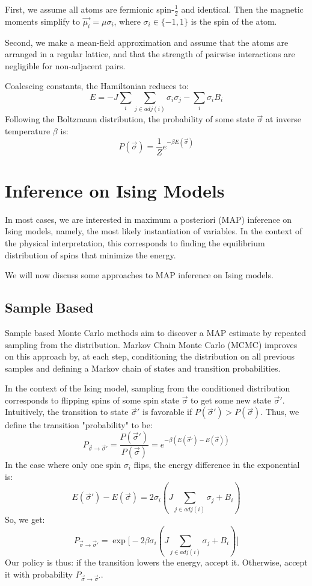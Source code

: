 \documentclass{article}
\begin{document}
First, we assume all atoms are fermionic spin-$\frac{1}{2}$ and identical. 
Then the magnetic moments simplify to $\vec{\mu_i} = \mu \sigma_i$, where 
$\sigma_i \in \{-1, 1\}$ is the spin of the atom. 

Second, we make a mean-field approximation and assume that the atoms are 
arranged in a regular lattice, and that the strength of pairwise interactions 
are negligible for non-adjacent pairs.

Coalescing constants, the Hamiltonian reduces to:
\begin{equation}\label{isingE}
    E = -J\sum_i \sum_{j \in adj(i)} \sigma_i \sigma_j - \sum_i \sigma_i B_i
\end{equation}
Following the Boltzmann distribution, the probability of some state 
$\vec{\sigma}$ at inverse temperature $\beta$ is:
\begin{equation} \label{boltzmann}
    P(\vec{\sigma}) = \frac{1}{Z}e^{-\beta E(\vec{\sigma})} 
\end{equation}

\section{Inference on Ising Models}

In most cases, we are interested in maximum a posteriori (MAP) inference on 
Ising models, namely, the most likely instantiation of variables. 
In the context of the physical interpretation, this corresponds to finding the 
equilibrium distribution of spins that minimize the energy. 

We will now discuss some approaches to MAP inference on Ising models. 

\subsection{Sample Based}

Sample based Monte Carlo methods aim to discover a MAP estimate by repeated 
sampling from the distribution. 
Markov Chain Monte Carlo (MCMC) improves on this approach by, at each step, 
conditioning the distribution on all previous samples and defining a Markov 
chain of states and transition probabilities. 

In the context of the Ising model, sampling from the conditioned distribution 
corresponds to flipping spins of some spin state $\vec{\sigma}$ to get some 
new state $\vec{\sigma}'$. 
Intuitively, the transition to state $\vec{\sigma}'$ is favorable if 
$P(\vec{\sigma}') > P(\vec{\sigma})$. 
Thus, we define the transition "probability" to be:
\[
    P_{\vec{\sigma} \rightarrow \vec{\sigma}'}
    = \frac{P(\vec{\sigma}')}{P(\vec{\sigma})}
    = e^{-\beta(E(\vec{\sigma}') - E(\vec{\sigma}))} 
\]
In the case where only one spin $\sigma_i$ flips, the energy difference in the 
exponential is:
\[
    E(\vec{\sigma}') - E(\vec{\sigma}) = 2 \sigma_i (J \sum_{j \in adj(i)} \sigma_j + B_i)
\]
So, we get:
\[
    P_{\vec{\sigma} \rightarrow \vec{\sigma}'}
    = \exp \Bigr [-2 \beta \sigma_i (J \sum_{j \in adj(i)} \sigma_j + B_i) \Bigr ]
\]
Our policy is thus: if the transition lowers the energy, accept it. 
Otherwise, accept it with probability $P_{\vec{\sigma} \rightarrow \vec{\sigma}'}$. 

\newpage



\end{document}
